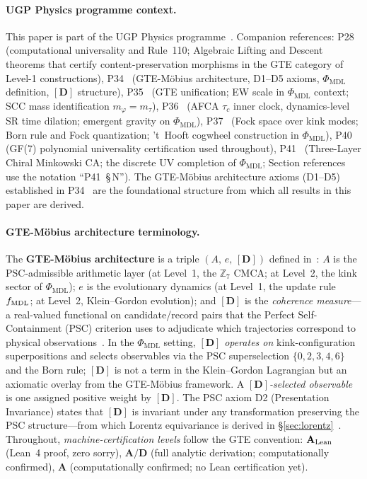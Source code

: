 \documentclass[11pt]{article}
\theoremstyle{remark}
\newcommand{\PHIMDL}{\Phi_{\mathrm{MDL}}}
\newcommand{\mtau}{m_\tau}
\newcommand{\CatA}{\textbf{A}}
\newcommand{\CatAL}{\ensuremath{\textbf{A}_{\rm Lean}}}
\newcommand{\CatAD}{\textbf{A/D}}
\begin{document}
\medskip

\paragraph{UGP Physics programme context.}
This paper is part of the UGP Physics programme~\cite{SpivackResearchProgrammes}.  Companion references:
P28~\cite{SpivackCompUniversality} (computational universality and Rule~110;
Algebraic Lifting and Descent theorems that certify content-preservation
morphisms in the GTE category of Level-1 constructions),
P34~\cite{SpivackGTEMobius} (GTE-M\"obius architecture, D1--D5 axioms,
$\PHIMDL$ definition, $[\mathbf{D}]$ structure),
P35~\cite{SpivackGTEUnification} (GTE unification; EW scale in $\PHIMDL$
context; SCC mass identification $m_\varphi=\mtau$),
P36~\cite{SpivackEmergentGravity} (AFCA $\tau_c$ inner clock,
dynamics-level SR time dilation; emergent gravity on $\PHIMDL$),
P37~\cite{SpivackQMFromR110} (Fock space over kink modes; Born rule
and Fock quantization; 't~Hooft cogwheel construction in $\PHIMDL$),
P40~\cite{SpivackGF7Universality} (GF(7) polynomial universality
certification used throughout),
P41~\cite{SpivackCMCA} (Three-Layer Chiral Minkowski CA; the discrete
UV completion of $\PHIMDL$; Section references use the notation
``P41~\S\,N'').
The GTE-M\"obius architecture axioms (D1--D5) established in
P34~\cite{SpivackGTEMobius} are the foundational structure from which
all results in this paper are derived.

\paragraph{GTE-M\"obius architecture terminology.}
The \textbf{GTE-M\"obius architecture} is a triple $(A,\,e,\,[\mathbf{D}])$
defined in~\cite{SpivackGTEMobius}: $A$ is the PSC-admissible arithmetic
layer (at Level~1, the $\mathbb{Z}_7$ CMCA; at Level~2, the kink sector of
$\PHIMDL$); $e$ is the evolutionary dynamics (at Level~1, the update rule
$f_{\rm MDL}$; at Level~2, Klein--Gordon evolution); and $[\mathbf{D}]$ is
the \emph{coherence measure}---a real-valued functional on candidate/record
pairs that the Perfect Self-Containment (PSC) criterion uses to adjudicate
which trajectories correspond to physical
observations~\cite{SpivackGTEMobius}.  In the $\PHIMDL$ setting,
$[\mathbf{D}]$ \emph{operates on} kink-configuration superpositions and
selects observables via the PSC superselection $\{0,2,3,4,6\}$ and the Born
rule; $[\mathbf{D}]$ is not a term in the Klein--Gordon Lagrangian but an
axiomatic overlay from the GTE-M\"obius framework.  A
\emph{$[\mathbf{D}]$-selected observable} is one assigned positive weight by
$[\mathbf{D}]$.  The PSC axiom D2 (Presentation Invariance) states that
$[\mathbf{D}]$ is invariant under any transformation preserving the PSC
structure---from which Lorentz equivariance is derived in
\S\ref{sec:lorentz}~\cite{SpivackGTEMobius}.
Throughout, \emph{machine-certification levels} follow the GTE convention:
$\CatAL$ (Lean~4 proof, zero sorry), $\CatAD$ (full analytic derivation;
computationally confirmed), $\CatA$ (computationally confirmed; no
Lean certification yet).
\end{document}
